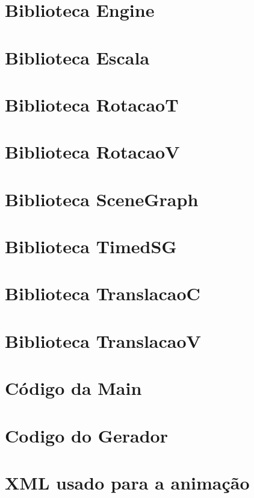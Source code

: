 \documentclass{article}
\begin{document}
\section{Biblioteca Engine}


\newpage

\section{Biblioteca Escala}


\newpage

\section{Biblioteca RotacaoT}


\newpage

\section{Biblioteca RotacaoV}


\newpage

\section{Biblioteca SceneGraph}


\newpage

\section{Biblioteca TimedSG}


\newpage

\section{Biblioteca TranslacaoC}


\newpage

\section{Biblioteca TranslacaoV}


\newpage

\section{Código da Main}

\newpage

\section{Codigo do Gerador}

\newpage

\section{XML usado para a animação}

\end{document}
